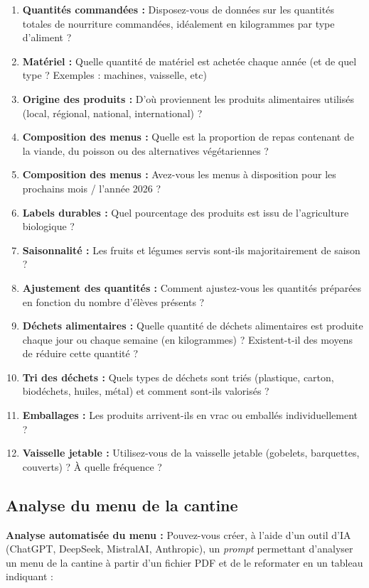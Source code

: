 \documentclass{exam}
\begin{document}
\begin{enumerate}[itemsep=2pt, topsep=2pt, parsep=0pt]
    \item \textbf{Quantités commandées :} Disposez-vous de données sur les quantités totales de nourriture commandées, idéalement en kilogrammes par type d'aliment ?
    \item \textbf{Matériel :} Quelle quantité de matériel est achetée chaque année (et de quel type ? Exemples : machines, vaisselle, etc)
    \item \textbf{Origine des produits :} D'où proviennent les produits alimentaires utilisés (local, régional, national, international) ?
    \item \textbf{Composition des menus :} Quelle est la proportion de repas contenant de la viande, du poisson ou des alternatives végétariennes ?
    \item \textbf{Composition des menus :} Avez-vous les menus à disposition pour les prochains mois / l'année 2026 ?
    \item \textbf{Labels durables :} Quel pourcentage des produits est issu de l'agriculture biologique ?
    \item \textbf{Saisonnalité :} Les fruits et légumes servis sont-ils majoritairement de saison ?
    \item \textbf{Ajustement des quantités :} Comment ajustez-vous les quantités préparées en fonction du nombre d’élèves présents ?
    \item \textbf{Déchets alimentaires :} Quelle quantité de déchets alimentaires est produite chaque jour ou chaque semaine (en kilogrammes) ? Existent-t-il des moyens de réduire cette quantité ?
    \item \textbf{Tri des déchets :} Quels types de déchets sont triés (plastique, carton, biodéchets, huiles, métal) et comment sont-ils valorisés ?
    \item \textbf{Emballages :} Les produits arrivent-ils en vrac ou emballés individuellement ?
    \item \textbf{Vaisselle jetable :} Utilisez-vous de la vaisselle jetable (gobelets, barquettes, couverts) ? À quelle fréquence ?
\end{enumerate}

\subsection*{Analyse du menu de la cantine}

\textbf{Analyse automatisée du menu :} Pouvez-vous créer, à l'aide d'un outil d'IA (ChatGPT, DeepSeek, MistralAI, Anthropic), un \emph{prompt} permettant d'analyser un menu de la cantine à partir d'un fichier PDF et de le reformater en un tableau indiquant :
\end{document}
